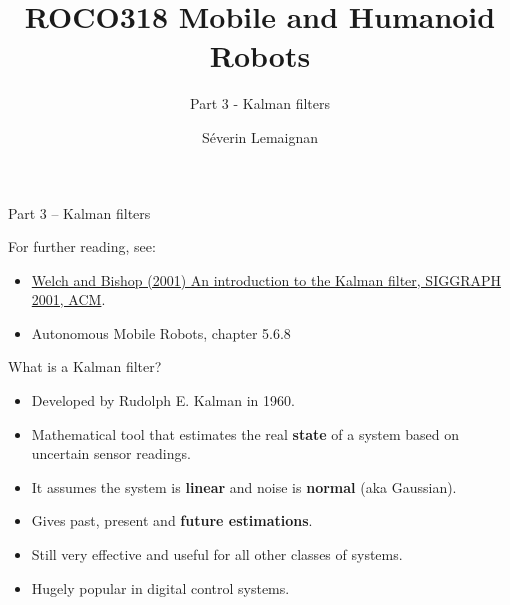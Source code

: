 \documentclass[compress]{beamer}
\title{ROCO318 \newline Mobile and Humanoid Robots}
\subtitle{Part 3 - Kalman filters}
\date{}
\author{Séverin Lemaignan}
\institute{Centre for Neural Systems and Robotics\\{\bf Plymouth University}}
\begin{document}

\maketitle

\begin{frame}{Part 3 -- Kalman filters}

    For further reading, see:
    \begin{itemize}
        \item \href{http://www.cs.unc.edu/~welch/kalman/}{Welch and Bishop
            (2001) An introduction to the Kalman filter, SIGGRAPH 2001, ACM}.
        \item Autonomous Mobile Robots, chapter 5.6.8
    \end{itemize}
    


\end{frame}

\begin{frame}{What is a Kalman filter?}

    \begin{itemize}
        \item Developed by Rudolph E. Kalman in 1960.
        \item Mathematical tool that estimates the real
            \textbf{state} of a system based on uncertain
            sensor readings.
        \item It assumes the system is \textbf{linear} and noise is
            \textbf{normal} (aka Gaussian).
        \item Gives past, present and \textbf{future estimations}.
        \item Still very effective and useful for all other classes of systems.
        \item Hugely popular in digital control systems.
    \end{itemize}


\end{frame}
\end{document}
